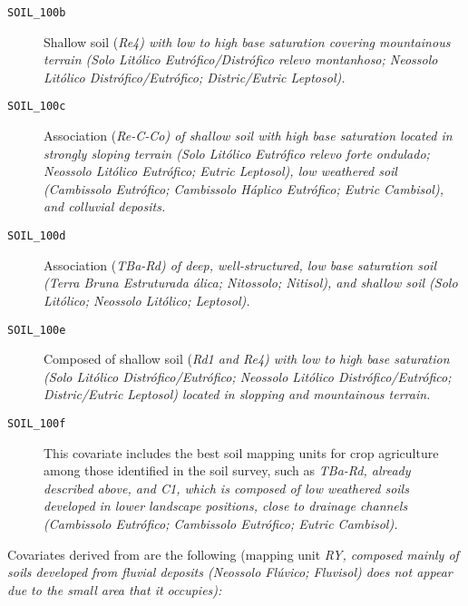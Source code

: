\begin{description}
 \item[\tt{SOIL\_100b}] Shallow soil (\it{Re4}) with low to high base saturation covering mountainous 
 terrain (Solo Litólico Eutrófico/Distrófico relevo montanhoso; Neossolo Litólico Distrófico/Eutrófico;
 Distric/Eutric Leptosol).
  
 \item[\tt{SOIL\_100c}] Association (\it{Re-C-Co}) of shallow soil with high base saturation located in
 strongly sloping terrain (Solo Litólico Eutrófico relevo forte ondulado; Neossolo Litólico Eutrófico; Eutric
 Leptosol), low weathered soil (Cambissolo Eutrófico; Cambissolo Háplico Eutrófico; Eutric Cambisol), and
 colluvial deposits.
  
 \item[\tt{SOIL\_100d}] Association (\it{TBa-Rd}) of deep, well-structured, low base saturation soil (Terra
 Bruna Estruturada álica; Nitossolo; Nitisol), and shallow soil (Solo Litólico; Neossolo Litólico; Leptosol).
  
 \item[\tt{SOIL\_100e}] Composed of shallow soil (\it{Rd1} and \textit{Re4}) with low to high base
 saturation (Solo Litólico Distrófico/Eutrófico; Neossolo Litólico Distrófico/Eutrófico; Distric/Eutric
 Leptosol) located in slopping and mountainous terrain.
  
 \item[\tt{SOIL\_100f}] This covariate includes the best soil mapping units for crop agriculture among those 
 identified in the soil survey, such as \it{TBa-Rd}, already described above, and \it{C1}, which is composed
 of low weathered soils developed in lower landscape positions, close to drainage channels (Cambissolo
 Eutrófico; Cambissolo Eutrófico; Eutric Cambisol).
\end{description}

Covariates derived from \soilNew{} are the following (mapping unit \it{RY}, composed mainly of soils developed 
from fluvial deposits (Neossolo Flúvico; Fluvisol) does not appear due to the small area that it occupies):

